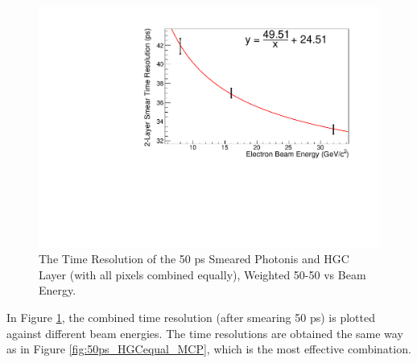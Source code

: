 \documentclass[twocolumn,aps,prd,reprint,superscriptaddress,floatfix]{revtex4-1}
\begin{document}
\begin{figure}[!htbp]
\centering
	\includegraphics[width=\linewidth]{resplotsmear.pdf}
    \caption{The Time Resolution of the 50 ps Smeared Photonis and HGC Layer (with all pixels combined equally), Weighted 50-50 vs Beam Energy. }
    \label{fig:resplotsmear}
\end{figure}

In Figure \ref{fig:resplotsmear}, the combined time resolution (after smearing 50 ps) is plotted against different beam energies. The time resolutions are obtained the same way as in Figure \ref{fig:50ps_HGCequal_MCP}, which is the most effective combination.
\end{document}
